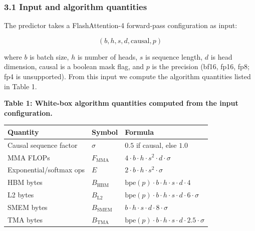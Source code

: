 \subsubsection{3.1 Input and algorithm
quantities}\label{input-and-algorithm-quantities}

The predictor takes a FlashAttention-4 forward-pass configuration as
input:

\[
(b, h, s, d, \text{causal}, p)
\]

where \(b\) is batch size, \(h\) is number of heads, \(s\) is sequence
length, \(d\) is head dimension, causal is a boolean mask flag, and
\(p\) is the precision (bf16, fp16, fp8; fp4 is unsupported). From this
input we compute the algorithm quantities listed in Table 1.

\textbf{Table 1: White-box algorithm quantities computed from the input
configuration.}

{\def\LTcaptype{none} %
\begin{longtable}[]{@{}
  >{\raggedright\arraybackslash}p{}
  >{\raggedright\arraybackslash}p{}
  >{\raggedright\arraybackslash}p{}@{}}
\toprule\noalign{}
\begin{minipage}[b]{\linewidth}\raggedright
Quantity
\end{minipage} & \begin{minipage}[b]{\linewidth}\raggedright
Symbol
\end{minipage} & \begin{minipage}[b]{\linewidth}\raggedright
Formula
\end{minipage} \\
\midrule\noalign{}
\endhead
\bottomrule\noalign{}
\endlastfoot
Causal sequence factor & \(\sigma\) & \(0.5\) if causal, else \(1.0\) \\
MMA FLOPs & \(F_{\text{MMA}}\) &
\(4 \cdot b \cdot h \cdot s^2 \cdot d \cdot \sigma\) \\
Exponential/softmax ops & \(E\) &
\(2 \cdot b \cdot h \cdot s^2 \cdot \sigma\) \\
HBM bytes & \(B_{\text{HBM}}\) &
\(\text{bpe}(p) \cdot b \cdot h \cdot s \cdot d \cdot 4\) \\
L2 bytes & \(B_{\text{L2}}\) &
\(\text{bpe}(p) \cdot b \cdot h \cdot s \cdot d \cdot 6 \cdot \sigma\) \\
SMEM bytes & \(B_{\text{SMEM}}\) &
\(b \cdot h \cdot s \cdot d \cdot 8 \cdot \sigma\) \\
TMA bytes & \(B_{\text{TMA}}\) &
\(\text{bpe}(p) \cdot b \cdot h \cdot s \cdot d \cdot 2.5 \cdot \sigma\) \\
\end{longtable}
}

